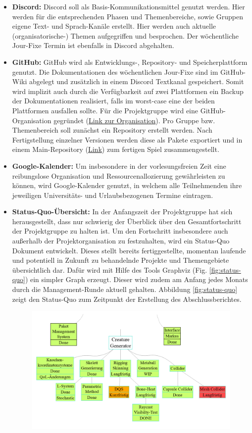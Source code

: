 \begin{itemize}
	\item \textbf{Discord: } Discord soll als Basis-Kommunikationsmittel genutzt werden. Hier werden für die entsprechenden Phasen und Themenbereiche, sowie Gruppen eigene Text- und Sprach-Kanäle erstellt. Hier werden auch aktuelle (organisatorische-) Themen aufgegriffen und besprochen. Der wöchentliche Jour-Fixe Termin ist ebenfalls in Discord abgehalten. 
	\item \textbf{GitHub: } GitHub wird als Entwicklungs-, Repository- und Speicherplattform genutzt. Die Dokumentationen des wöchentlichen Jour-Fixe sind im GitHub-Wiki abgelegt und zusätzlich in einem Discord Textkanal gespeichert. Somit wird implizit auch durch die Verfügbarkeit auf zwei Plattformen ein Backup der Dokumentationen realisiert, falls im worst-case eine der beiden Plattformen ausfallen sollte. Für die Projektgruppe wird eine GitHub-Organisation gegründet (\href{https://github.com/PG649-3D-RPG}{Link zur Organisation}). Pro Gruppe bzw. Themenbereich soll zunächst ein Repository erstellt werden. Nach Fertigstellung einzelner Versionen werden diese als Pakete exportiert und in einem Main-Repository (\href{https://github.com/PG649-3D-RPG/Horror-Survival-RPG}{Link}) zum fertigen Spiel zusammengestellt.
	\item \textbf{Google-Kalender: } Um insbesondere in der vorlesungsfreien Zeit eine reibungslose Organisation und Ressourcenallozierung gewährleisten zu können, wird Google-Kalender genutzt, in welchem alle Teilnehmenden ihre jeweiligen Universitäts- und Urlaubsbezogenen Termine eintragen.
	\item \textbf{Status-Quo-Übersicht: } In der Anfangszeit der Projektgruppe hat sich herausgestellt, dass nur schwierig der Überblick über den Gesamtfortschritt der Projektgruppe zu halten ist. Um den Fortschritt insbesondere auch außerhalb der Projektorganisation zu festzuhalten, wird ein Status-Quo Dokument entwickelt. Dieses stellt bereits fertiggestellte, momentan laufende und potentiell in Zukunft zu behandelnde Projekte und Themengebiete übersichtlich dar. Dafür wird mit Hilfe des Tools Graphviz (Fig. \ref{fig:status-quo}) ein simpler Graph erzeugt. Dieser wird zudem am Anfang jedes Monats durch die Management-Runde aktuell gehalten. Abbildung \ref{fig:status-quo} zeigt den Status-Quo zum Zeitpunkt der Erstellung des Abschlussberichtes.
	\begin{figure}
		\centering
		\includegraphics[width=0.7\linewidth]{resources/img/Graphviz_fin_CG.png}

\end{figure}
\end{itemize}
